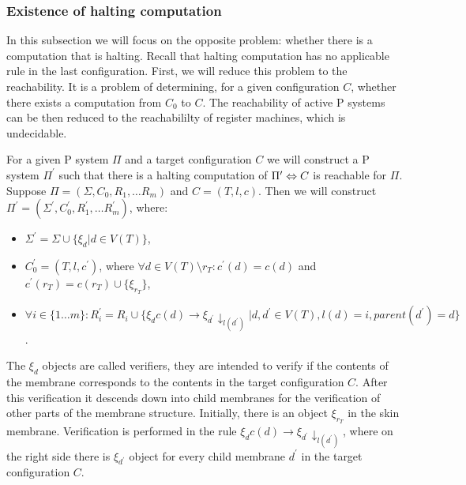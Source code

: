 
\subsubsection{Existence of halting computation} %
\label{ssub:existence_of_halting_computation}

In this subsection we will focus on the opposite problem: whether there is a computation that is halting. Recall that halting computation has no applicable rule in the last configuration.
First, we will reduce this problem to the reachability. It is a problem of determining, for a given configuration $C$, whether there exists a computation from $C_0$ to $C$. The reachability of active P systems can be then reduced to the reachabililty of register machines, which is undecidable.

For a given P system $\Pi$ and a target configuration $C$ we will construct a P system $\Pi^\prime$ such that there is a halting computation of $\Pi^\prime\Leftrightarrow\linebreak C$ is reachable for $\Pi$. Suppose $\Pi = (\Sigma, C_0, R_1, \dots R_m)$ and $C = (T, l, c)$. Then we will construct $\Pi^\prime = (\Sigma^\prime, C_0^\prime, R_1^\prime, \dots R_m^\prime)$, where:

\begin{itemize}
  \item $\Sigma^\prime = \Sigma\cup\{\xi_d|d\in V(T)\}$,
  \item $C_0^\prime = (T, l, c^\prime)$, where $\forall d\in V(T)\setminus r_T: c^\prime(d) = c(d)$ and $c^\prime(r_T) = c(r_T)\cup\{\xi_{r_T}\}$,
  \item $\forall i\in\{1\dots m\}: R_i^\prime = R_i\cup\{\xi_d c(d)\rightarrow\xi_{d^\prime}\downarrow_{l(d^\prime)}|d,d^\prime\in V(T),l(d)=i,parent(d^\prime)=d\}$.
\end{itemize}

The $\xi_d$ objects are called verifiers, they are intended to verify if the contents of the membrane corresponds to the contents in the target configuration $C$. After this verification it descends down into child membranes for the verification of other parts of the membrane structure.
Initially, there is an object $\xi_{r_T}$ in the skin membrane. Verification is performed in the rule $\xi_d c(d)\rightarrow\xi_{d^\prime}\downarrow_{l(d^\prime)}$, where on the right side there is $\xi_{d^\prime}$ object for every child membrane $d^\prime$ in the target configuration $C$.

